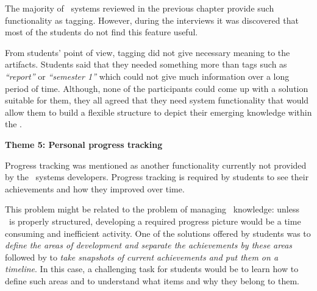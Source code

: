 
The majority of \ep~systems reviewed in the previous chapter provide such
functionality as tagging. However, during the interviews it was discovered that
most of the students do not find this feature useful.


From students' point of view, tagging did not give necessary meaning to the
artifacts. Students said that they needed something more than tags such as
\textit{``report''} or \textit{``semester 1''} which could not give much
information over a long period of time. Although, none of the participants could
come up with a solution suitable for them, they all agreed that they need system
functionality that would allow them to build a flexible structure to depict
their emerging knowledge within the \ep.

\textbf{Theme 5: Personal progress tracking}

Progress tracking was mentioned as another functionality currently not provided
by the \ep~systems developers. Progress tracking is required by students to see
their achievements and how they improved over time.


This problem might be related to the problem of managing \ep~knowledge: unless
\ep~is properly structured, developing a required progress picture would be a
time consuming and inefficient activity. One of the solutions offered by
students was to \textit{define the areas of development and separate the
achievements by these areas} followed by to \textit{take snapshots of current
achievements and put them on a timeline}. In this case, a challenging task for
students would be to learn how to define such areas and to understand what
items and why they belong to them.

